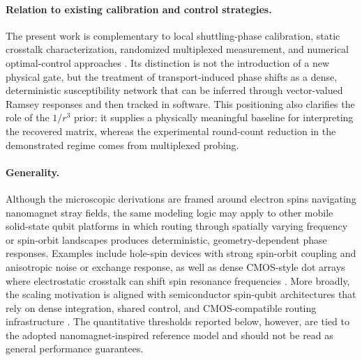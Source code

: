 \documentclass[a4paper,twocolumn,11pt]{quantumarticle}
\begin{document}
\paragraph{Relation to existing calibration and control strategies.}
The present work is complementary to local shuttling-phase calibration, static crosstalk characterization, randomized multiplexed measurement, and numerical optimal-control approaches \cite{de_smet_high-fidelity_2025, tanttu_assessment_2024, ruffino_cryo-cmos_2022, harper_efficient_2020, proctor_benchmarking_2025, glaser_training_2015}. Its distinction is not the introduction of a new physical gate, but the treatment of transport-induced phase shifts as a dense, deterministic susceptibility network that can be inferred through vector-valued Ramsey responses and then tracked in software. This positioning also clarifies the role of the $1/r^3$ prior: it supplies a physically meaningful baseline for interpreting the recovered matrix, whereas the experimental round-count reduction in the demonstrated regime comes from multiplexed probing.

\paragraph{Generality.}
Although the microscopic derivations are framed around electron spins navigating nanomagnet stray fields, the same modeling logic may apply to other mobile solid-state qubit platforms in which routing through spatially varying frequency or spin-orbit landscapes produces deterministic, geometry-dependent phase responses. Examples include hole-spin devices with strong spin-orbit coupling and anisotropic noise or exchange response, as well as dense CMOS-style dot arrays where electrostatic crosstalk can shift spin resonance frequencies \cite{hendrickx_sweet-spot_2024, geyer_anisotropic_2024, cifuentes_impact_2024}. More broadly, the scaling motivation is aligned with semiconductor spin-qubit architectures that rely on dense integration, shared control, and CMOS-compatible routing infrastructure \cite{burkard_semiconductor_2023, gonzalez-zalba_scaling_2021, borsoi_shared_2024}. The quantitative thresholds reported below, however, are tied to the adopted nanomagnet-inspired reference model and should not be read as general performance guarantees.
\end{document}
